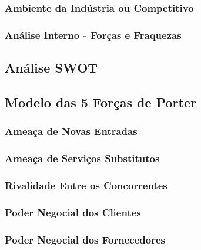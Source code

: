 \documentclass[11pt]{article}
\begin{document}
	\normalsize
	
	
	\large
	\subsubsection{Ambiente da Indústria ou Competitivo}
	
	\normalsize
	
	
	\large
	\subsubsection{Análise Interno - Forças e Fraquezas}
	
	\normalsize
	
	
	\large
	\subsection{Análise SWOT}
	
	\normalsize
	
	
	\large
	\subsection{Modelo das 5 Forças de Porter}
	
	\normalsize
	
	
	\large
	\subsubsection{Ameaça de Novas Entradas}
	
	\normalsize
	
	
	\large
	\subsubsection{Ameaça de Serviços Substitutos}
	
	\normalsize
	
	
	\large
	\subsubsection{Rivalidade Entre os Concorrentes}
	
	\normalsize
	
	
	\large
	\subsubsection{Poder Negocial dos Clientes}
	
	\normalsize
	
	
	\large
	\subsubsection{Poder Negocial dos Fornecedores}
	
\end{document}
